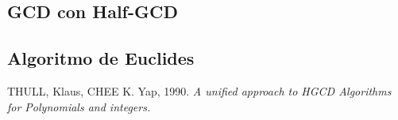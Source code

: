 \documentclass[10pt]{article}
\theoremstyle{definition}
\begin{document}
\subsection*{GCD con Half-GCD}

\subsection*{Algoritmo de Euclides}

\newpage
\begin{thebibliography}{}
\bibitem{}THULL, Klaus, CHEE K. Yap, 1990. \textit{A unified approach to HGCD Algorithms for Polynomials and integers.}

\end{thebibliography}
\end{document}
